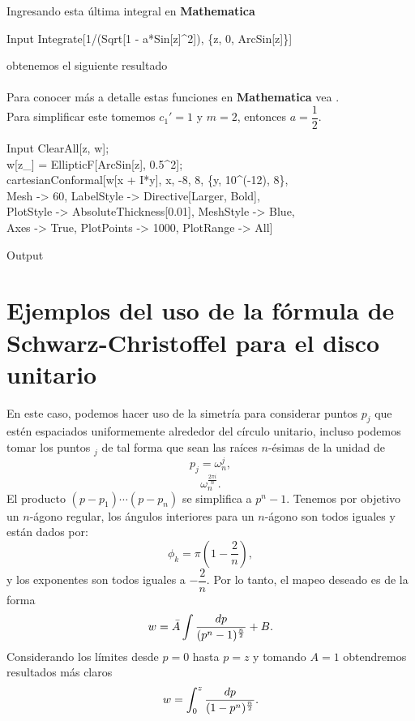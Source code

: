 Ingresando esta última integral en \textbf{Mathematica}
\begin{mmaCell}{Input}
	 Integrate[1/(Sqrt[1 - a*Sin[z]^2]), \{z, 0, ArcSin[z]\}]
\end{mmaCell}
obtenemos el siguiente resultado\\
\\
Para conocer más a detalle estas funciones en \textbf{Mathematica} vea \cite{Elliptic}.\\
Para simplificar este tomemos $c_1'=1$ y $m=2$, entonces $a=\dfrac{1}{2}$.
\begin{mmaCell}{Input}
	 ClearAll[z, w];\\w[z_] = EllipticF[ArcSin[z], 0.5^2];\\cartesianConformal[w[x + I*y], {x, -8, 8}, \{y, 10^(-12), 8\},\\Mesh -> 60, LabelStyle -> Directive[Larger, Bold],\\PlotStyle -> AbsoluteThickness[0.01], MeshStyle -> Blue,\\Axes -> True, PlotPoints -> 1000, PlotRange -> All]
\end{mmaCell}
\begin{mmaCell}[moregraphics={moreig={scale=0.8}}]{Output}
\end{mmaCell}
\section{Ejemplos del uso de la fórmula de Schwarz-Christoffel para el disco unitario}
En este caso, podemos hacer uso de la simetría para considerar puntos $p_j$ que estén espaciados uniformemente alrededor del círculo unitario, incluso podemos tomar los puntos $_j$ de tal forma que sean las raíces $n$-ésimas de la unidad de
$$p_j=\omega_n^j,$$
$$\omega_n^{\frac{2\pi i}{n}}.$$
El producto $(p-p_1)\cdots (p-p_n)$ se simplifica a $p^n-1$. Tenemos por objetivo un $n$-ágono regular, los ángulos interiores para un $n$-ágono son todos iguales y están dados por:
$$\phi_k=\pi\left(1-\dfrac{2}{n}\right),$$
y los exponentes son todos iguales a $-\dfrac{2}{n}$. Por lo tanto, el mapeo deseado es de la forma 
\begin{equation}
	w=\bar{A}\displaystyle\int \dfrac{dp}{(p^n-1)^{\frac{n}{2}}}+B.
\end{equation} 
Considerando los límites desde $p=0$ hasta $p=z$ y tomando $A=1$ obtendremos resultados más claros
\begin{equation}\label{SCn}
	w=\displaystyle\int_{0}^{z}\dfrac{dp}{(1-p^n)^{\frac{n}{2}}}.
\end{equation}
